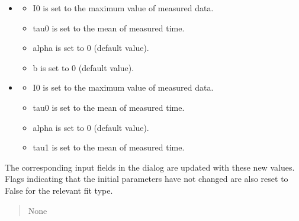 \documentclass[letterpaper,10pt,english]{sphinxmanual}
\begin{document}
\begin{fulllineitems}
\begin{fulllineitems}
\begin{itemize}
\begin{description}
\begin{itemize}
\end{itemize}

\end{description}

\item {} \begin{description}
\begin{itemize}
\item {} 
\sphinxAtStartPar
I0 is set to the maximum value of measured data.

\item {} 
\sphinxAtStartPar
tau0 is set to the mean of measured time.

\item {} 
\sphinxAtStartPar
alpha is set to 0 (default value).

\item {} 
\sphinxAtStartPar
b is set to 0 (default value).

\end{itemize}

\end{description}

\item {} \begin{description}
\begin{itemize}
\item {} 
\sphinxAtStartPar
I0 is set to the maximum value of measured data.

\item {} 
\sphinxAtStartPar
tau0 is set to the mean of measured time.

\item {} 
\sphinxAtStartPar
alpha is set to 0 (default value).

\item {} 
\sphinxAtStartPar
tau1 is set to the mean of measured time.

\end{itemize}

\end{description}

\end{itemize}

\sphinxAtStartPar
The corresponding input fields in the dialog are updated with these new values. 
Flags indicating that the initial parameters have not changed are also reset to False for the relevant fit type.
\begin{quote}\begin{description}
\sphinxAtStartPar
None


\end{description}
\end{quote}
\end{fulllineitems}
\end{fulllineitems}
\end{document}
